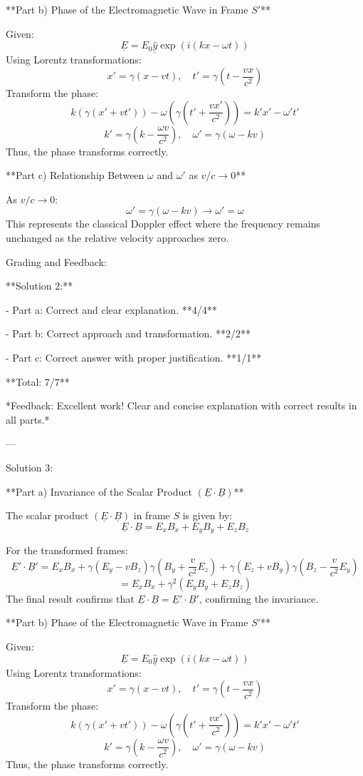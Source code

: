 \documentclass[a4paper,11pt]{article}
\begin{document}
**Part b) Phase of the Electromagnetic Wave in Frame \( S' \)**

Given:
\[
\underline{E} = E_{0} \hat{\underline{y}} \exp(i(kx - \omega t))
\]
Using Lorentz transformations:
\[
x' = \gamma(x - vt), \quad t' = \gamma(t - \frac{vx}{c^{2}})
\]
Transform the phase:
\[
k (\gamma (x' + vt')) - \omega (\gamma (t' + \frac{vx'}{c^2})) = k' x' - \omega' t'
\]
\[
k' = \gamma (k - \frac{\omega v}{c^2}), \quad \omega' = \gamma (\omega - kv)
\]
Thus, the phase transforms correctly.

**Part c) Relationship Between \( \omega \) and \( \omega' \) as \( v/c \rightarrow 0 \)**

As \( v/c \rightarrow 0 \):
\[
\omega' = \gamma(\omega - kv) \rightarrow \omega' = \omega
\]
This represents the classical Doppler effect where the frequency remains unchanged as the relative velocity approaches zero.

Grading and Feedback:

**Solution 2:**

- Part a: Correct and clear explanation. **4/4**

- Part b: Correct approach and transformation. **2/2**

- Part c: Correct answer with proper justification. **1/1**

**Total: 7/7**

*Feedback: Excellent work! Clear and concise explanation with correct results in all parts.*

---

Solution 3:

**Part a) Invariance of the Scalar Product \( (\underline{E} \cdot \underline{B}) \)**

The scalar product \( (\underline{E} \cdot \underline{B}) \) in frame \( S \) is given by:
\[
\underline{E} \cdot \underline{B} = E_{x}B_{x} + E_{y}B_{y} + E_{z}B_{z}
\]

For the transformed frames:
\[
\underline{E}' \cdot \underline{B}' = E_{x}B_{x} + \gamma(E_{y} - vB_{z})\gamma(B_{y} + \frac{v}{c^{2}}E_{z}) + \gamma(E_{z} + vB_{y})\gamma(B_{z} - \frac{v}{c^{2}}E_{y})
\]
\[
= E_x B_x + \gamma^2 (E_y B_y + E_z B_z)
\]
The final result confirms that \(\underline{E} \cdot \underline{B} = \underline{E}' \cdot \underline{B}'\), confirming the invariance.

**Part b) Phase of the Electromagnetic Wave in Frame \( S' \)**

Given:
\[
\underline{E} = E_{0} \hat{\underline{y}}

 \exp(i(kx - \omega t))
\]
Using Lorentz transformations:
\[
x' = \gamma(x - vt), \quad t' = \gamma(t - \frac{vx}{c^{2}})
\]
Transform the phase:
\[
k (\gamma (x' + vt')) - \omega (\gamma (t' + \frac{vx'}{c^2})) = k' x' - \omega' t'
\]
\[
k' = \gamma (k - \frac{\omega v}{c^2}), \quad \omega' = \gamma (\omega - kv)
\]
Thus, the phase transforms correctly.
\end{document}
